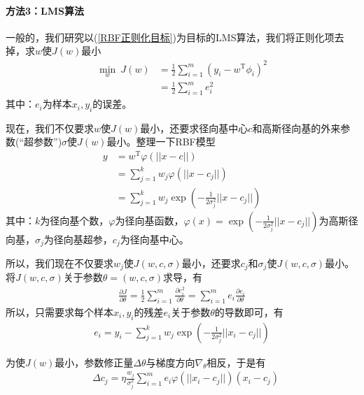 {            \paragraph{方法3：LMS算法}
            一般的，我们研究以(\ref{RBF正则化目标})为目标的LMS算法，我们将正则化项去掉，求$w$使$J(w)$最小
            \begin{align*}
            \min_w \ J(w) & = \frac{1}{2} \sum_{i=1}^m \left( y_i - w^\mathrm{T}\phi_i \right) ^2 \\
            & = \frac{1}{2}\sum_{i=1}^m e_i^2
            \end{align*}
            其中：$e_i$为样本$x_i,y_i$的误差。
            \par
            现在，我们不仅要求$w$使$J(w)$最小，还要求径向基中心$c$和高斯径向基的外来参数(“超参数”)$\sigma$使$J(w)$最小。整理一下RBF模型
            \begin{align*}
            y & = w^\mathrm{T}\varphi(||x-c||)\\
            & =\sum_{j=1}^k w_j\varphi(||x-c_j||)\\
            & =\sum_{j=1}^k w_j\exp \left( -\frac{1}{2\sigma_j^2}||x-c_j|| \right)
            \end{align*}
            其中：$k$为径向基个数，$\varphi$为径向基函数，$\varphi(x) = \exp \left( -\frac{1}{2\sigma_j^2}||x-c_j|| \right) $为高斯径向基，$\sigma_j$为径向基超参，$c_j$为径向基中心。
            \par
            所以，我们现在不仅要求$w_j$使$J(w,c,\sigma)$最小，还要求$c_j$和$\sigma_j$使$J(w,c,\sigma)$最小。将$J(w,c,\sigma)$关于参数$\theta = (w,c,\sigma)$求导，有
            \begin{align*}
            \frac{\partial J}{\partial \theta} = \frac{1}{2} \sum_{i=1}^m \frac{\partial e_i^2}{\partial \theta} = \sum_{i=1}^m e_i \frac{\partial e_i}{\partial \theta}
            \end{align*}
            所以，只需要求每个样本$x_i,y_i$的残差$e_i$关于参数$\theta$的导数即可，有
            \begin{align*}
            e_i = y_i - \sum_{j=1}^k w_j\exp \left( -\frac{1}{2\sigma_j^2}||x_i-c_j|| \right)
            \end{align*}
            \par
            为使$J(w)$最小，参数修正量$\Delta \theta$与梯度方向$\nabla_\theta$相反，于是有
            \begin{align*}
            & \Delta c_j = \eta \frac{w_j}{\sigma_j^2} \sum_{i=1}^m e_i \varphi (||x_i-c_j||)(x_i-c_j)\\

\end{align*}}
